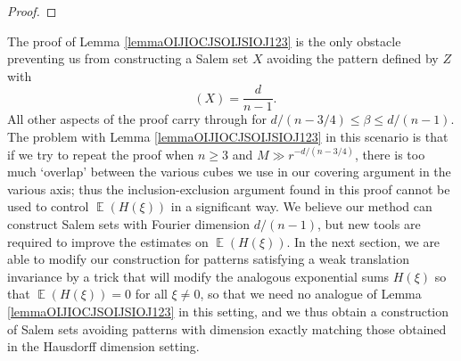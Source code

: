 \documentclass[dvipsnames,letterpaper,12pt]{article}
\numberwithin{equation}{section}
\DeclareMathOperator{\fordim}{\dim_{\mathbb{F}}}
\DeclareMathOperator{\ZZ}{\mathbb{Z}}
\DeclareMathOperator{\TT}{\mathbb{T}}
\numberwithin{theorem}{section}
\DeclareMathOperator{\EE}{\mathbb{E}}
\begin{document}
\begin{proof}
\end{proof}

The proof of Lemma \ref{lemmaOIJIOCJSOIJSIOJ123} is the only obstacle preventing us from constructing a Salem set $X$ avoiding the pattern defined by $Z$ with
%
\[ \fordim(X) = \frac{d}{n-1}. \]
%
All other aspects of the proof carry through for $d/(n-3/4) \leq \beta \leq d/(n-1)$. The problem with Lemma \ref{lemmaOIJIOCJSOIJSIOJ123} in this scenario is that if we try to repeat the proof when $n \geq 3$ and $M \gg r^{-d/(n-3/4)}$, there is too much `overlap' between the various cubes we use in our covering argument in the various axis; thus the inclusion-exclusion argument found in this proof cannot be used to control $\EE(H(\xi))$ in a significant way. We believe our method can construct Salem sets with Fourier dimension $d/(n-1)$, but new tools are required to improve the estimates on $\EE(H(\xi))$. In the next section, we are able to modify our construction for patterns satisfying a weak translation invariance by a trick that will modify the analogous exponential sums $H(\xi)$ so that $\EE(H(\xi)) = 0$ for all $\xi \neq 0$, so that we need no analogue of Lemma \ref{lemmaOIJIOCJSOIJSIOJ123} in this setting, and we thus obtain a construction of Salem sets avoiding patterns with dimension exactly matching those obtained in the Hausdorff dimension setting.
\end{document}
